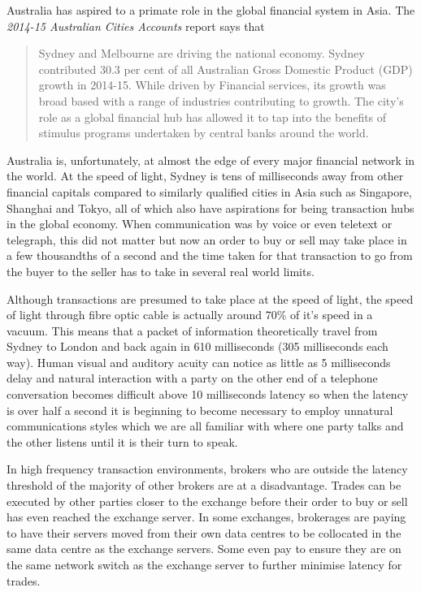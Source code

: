 Australia has aspired to a primate role in the global financial system in Asia. The \textit{2014-15 Australian Cities Accounts} report says that

\begin{quotation}
Sydney and Melbourne are driving the national economy. Sydney contributed 30.3 per cent of all Australian Gross Domestic Product (GDP) growth in 2014-15. While driven by Financial services, its growth was broad based with a range of industries contributing to growth. The city's role as a global financial hub has allowed it to tap into the benefits of stimulus programs undertaken by central banks around the world\cite{RefWorks:278}.

\end{quotation}

Australia is, unfortunately, at almost the edge of every major financial network in the world. At the speed of light, Sydney is tens of milliseconds away from other financial capitals compared to similarly qualified cities in Asia such as Singapore, Shanghai and Tokyo, all of which also have aspirations for being transaction hubs in the global economy. When communication was by voice or even teletext or telegraph, this did not matter but now an order to buy or sell may take place in a few thousandths of a second and the time taken for that transaction to go from the buyer to the seller has to take in several real world limits.

Although transactions are presumed to take place at the speed of light, the speed of light through fibre optic cable is actually around 70\% of it's speed in a vacuum. This means that a packet of information theoretically travel from Sydney to London and back again in 610 milliseconds (305 milliseconds each way). Human visual and auditory acuity can notice as little as 5 milliseconds delay and natural interaction with a party on the other end of a telephone conversation becomes difficult above 10 milliseconds latency so when the latency is over half a second it is beginning to become necessary to employ unnatural communications styles which we are all familiar with where one party talks and the other listens until it is their turn to speak. 

In high frequency transaction environments, brokers who are outside the latency threshold of the majority of other brokers are at a disadvantage. Trades can be executed by other parties closer to the exchange before their order to buy or sell has even reached the exchange server. In some exchanges, brokerages are paying to have their servers moved from their own data centres to be collocated in the same data centre as the exchange servers. Some even pay to ensure they are on the same network switch as the exchange server to further minimise latency for trades. 

